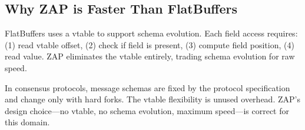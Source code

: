 \subsection{Why ZAP is Faster Than FlatBuffers}

FlatBuffers uses a vtable to support schema evolution. Each field access requires: (1) read vtable offset, (2) check if field is present, (3) compute field position, (4) read value. ZAP eliminates the vtable entirely, trading schema evolution for raw speed.

In consensus protocols, message schemas are fixed by the protocol specification and change only with hard forks. The vtable flexibility is unused overhead. ZAP's design choice---no vtable, no schema evolution, maximum speed---is correct for this domain.

